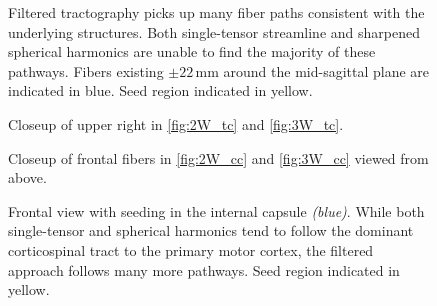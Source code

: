\documentclass[final,hyperref]{gatech-thesis}
\begin{document}
\begin{figure}[t]
  \centering

  \caption{Filtered tractography picks up many fiber paths consistent with the
    underlying structures.  Both single-tensor streamline and sharpened
    spherical harmonics are unable to find the majority of these pathways.
    Fibers existing $\pm22\,\text{mm}$ around the mid-sagittal plane are
    indicated in blue.  Seed region indicated in yellow.}
  \label{fig:W_tc}
\end{figure}
\begin{figure}[t]
  \centering
  \caption{Closeup of upper right in \autoref{fig:2W_tc} and
    \autoref{fig:3W_tc}.}
  \label{fig:W_tc_zoom}
\end{figure}
\begin{figure}[t]
  \centering
  \caption{Closeup of frontal fibers in \autoref{fig:2W_cc} and
    \autoref{fig:3W_cc} viewed from above.}
  \label{fig:frontal}
\end{figure}
\begin{figure}[t]
  \centering
  \caption{Frontal view with seeding in the internal capsule \textit{(blue)}.
    While both single-tensor and spherical harmonics tend to follow the
    dominant corticospinal tract to the primary motor cortex, the filtered
    approach follows many more pathways.  Seed region indicated in yellow.}
  \label{fig:ic_front}
\end{figure}
\end{document}
